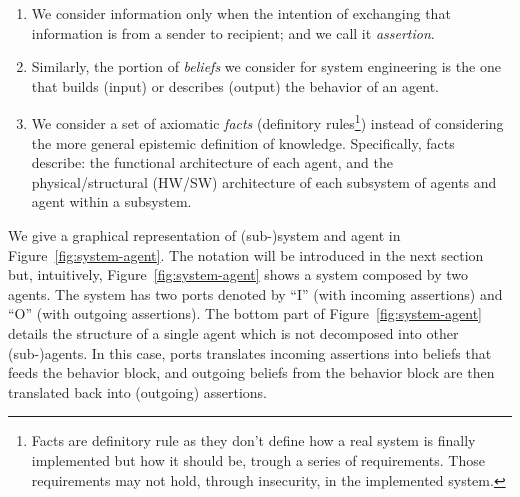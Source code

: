 \documentclass[conference]{IEEEtran}
\begin{document}
\begin{enumerate}
	\item We consider information only when the intention of exchanging 
		that information is from a sender to 
		recipient; and we call it \emph{assertion}.
	\item Similarly, the portion of \emph{beliefs} we consider for system
		engineering is the one that builds (input) or describes
		(output) the behavior of an agent.
	\item We consider a set of axiomatic \emph{facts} 
		(definitory
		rules\footnote{Facts are definitory rule as they don't
		define how a real system is finally implemented but
		how it should be, trough a series of requirements. Those requirements 
		may not hold, through insecurity, in the implemented system.}\autocite{Hintikka1993Information})
		instead of considering the more general epistemic definition of
		knowledge. Specifically, facts describe: the functional
		architecture of each agent, and the physical/structural (HW/SW)
		architecture of each subsystem of agents and agent within a
		subsystem.
\end{enumerate}
We give a graphical representation of (sub-)system and agent in Figure~\ref{fig:system-agent}.
The notation will be introduced in the next section but, intuitively,
Figure~\ref{fig:system-agent} shows a system composed by two agents. The system
has two ports denoted by ``I'' (with incoming assertions) and ``O'' (with outgoing assertions).
The bottom part of Figure~\ref{fig:system-agent} details the structure of a single
agent which is not decomposed into other (sub-)agents. In this case, ports translates
incoming assertions into beliefs that feeds the behavior block, and outgoing beliefs
from the behavior block are then translated back into (outgoing) assertions.
\end{document}
